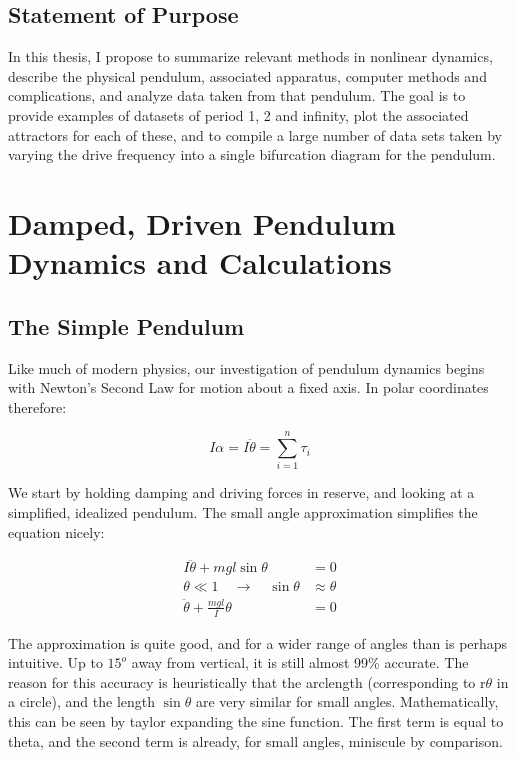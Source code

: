 \documentclass[12pt,twoside]{reedthesis}
\begin{document}
\section{Statement of Purpose}
In this thesis, I propose to summarize relevant methods in nonlinear dynamics, describe the physical pendulum, associated apparatus, computer methods and complications, and analyze data taken from that pendulum.  The goal is to provide examples of datasets of period 1, 2 and infinity, plot the associated attractors for each of these, and to compile a large number of data sets taken by varying the drive frequency into a single bifurcation diagram for the pendulum.  
	
	

\chapter{Damped, Driven Pendulum Dynamics and Calculations}	
\label{ddpds}
\section{The Simple Pendulum}

Like much of modern physics, our investigation of pendulum dynamics begins with Newton's Second Law for motion about a fixed axis.  In polar coordinates therefore: 

\begin{equation}
\label{Newton_II}
I \alpha = I \ddot{\theta} =  \sum_{i = 1}^n \tau_i
\end{equation}


We start by holding damping and driving forces in reserve, and looking at a simplified, idealized pendulum.  The small angle approximation simplifies the equation nicely:

\begin{align}
\label{idealized_pendulum}
I \ddot{\theta} + m g l \sin{\theta} & = 0 \\
\theta \ll 1 \quad  \rightarrow \quad  \sin\theta & \approx \theta \label{small_angle}\\
 \ddot{\theta} + \frac{mgl}{I}\theta & = 0 \label{idealized_pendulum_1}
\end{align}

The approximation is quite good, and for a wider range of angles than is perhaps intuitive.  Up to $15^o$ away from vertical, it is still almost 99\% accurate.  The reason for this accuracy is heuristically that the arclength (corresponding to r$\theta$ in a circle), and the length $\sin{\theta}$ are very similar for small angles.  Mathematically, this can be seen by taylor expanding the sine function.  The first term is equal to theta, and the second term is already, for small angles, miniscule by comparison.  
\end{document}
